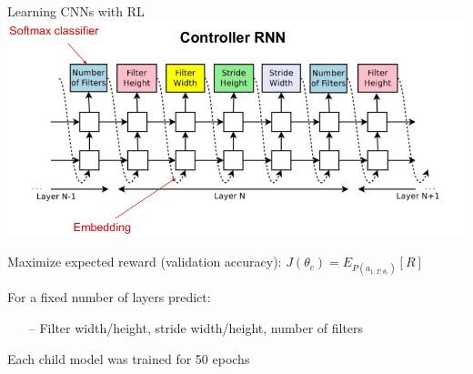 \begin{frame}[c]{Learning CNNs with RL }
\centering
\includegraphics[width=.8\textwidth]{images_lec7/RL_CNN_controller}

\begin{itemize}
\footnotesize{
	\item Maximize expected reward (validation accuracy): 
	$J(\theta_c)=E_{P(a_{1:T; \theta_c})}[R]$
	\item For a fixed number of layers predict:
	\begin{itemize}
		\item[--] Filter width/height, stride width/height, number of filters	
	\end{itemize}
	\item Each child model was trained for 50 epochs
	
}
\end{itemize}
\end{frame}
